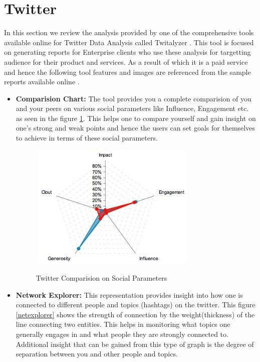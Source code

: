 \documentclass[12pt]{ucthesis}
\newcommand{\captionfonts}{\small\bf\ssp}
\begin{document}
\section{Twitter}
In this section we review the analysis provided by one of the comprehensive tools available online for Twitter Data Analysis called Twitalyzer \cite{twitalyzer}. This tool is focused on generating reports for Enterprise clients who use these analysis for targetting audience for their product and services. As a result of which it is a paid service and hence the following tool features and images are referenced from the sample reports available online \cite{twitalyzer_ex}.  

\begin{itemize}
  \item \textbf{Comparision Chart:} The tool provides you a complete comparision of you and your peers on various social parameters like Influence, Engagement etc. as seen in the figure \ref{twitcomp}. 
  This helps one to compare yourself and gain insight on one's strong and weak points and hence the users can set goals for themselves to achieve in terms of these social parameters. 
  
  \begin{figure}[!htb]
  \begin{center}
  \includegraphics[height=60mm, width=80mm]{twit_compare.JPG}
  \captionfonts
  \caption[Twitter Comparision]{Twitter Comparision on Social Parameters}
  \label{twitcomp}
  \end{center}
  \end{figure}%

  \item \textbf{Network Explorer:} This representation provides insight into how one is connected to different people and topics (hashtags) on the twitter. This figure \ref{netexplorer} shows the strength of connection by the weight(thickness) of the line connecting two entities. This helps in monitoring what topics one generally engages in and what people they are strongly connected to. 
  Additional insight that can be gained from this type of graph is the degree of separation between you and other people and topics.  
  

\end{itemize}
\end{document}

